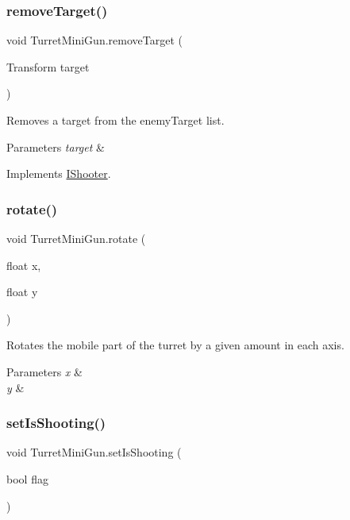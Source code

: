 \subsubsection{\texorpdfstring{remove\+Target()}{removeTarget()}}
{\footnotesize\ttfamily void Turret\+Mini\+Gun.\+remove\+Target (\begin{DoxyParamCaption}\item[{Transform}]{target }\end{DoxyParamCaption})}



Removes a target from the enemy\+Target list. 


\begin{DoxyParams}{Parameters}
{\em target} & \\
\hline
\end{DoxyParams}


Implements \mbox{\hyperlink{interface_i_shooter}{I\+Shooter}}.

\mbox{\label{class_turret_mini_gun_a31f68aef8df52f09916e4540c47c9fde}} 
\subsubsection{\texorpdfstring{rotate()}{rotate()}}
{\footnotesize\ttfamily void Turret\+Mini\+Gun.\+rotate (\begin{DoxyParamCaption}\item[{float}]{x,  }\item[{float}]{y }\end{DoxyParamCaption})}



Rotates the mobile part of the turret by a given amount in each axis. 


\begin{DoxyParams}{Parameters}
{\em x} & \\
\hline
{\em y} & \\
\hline
\end{DoxyParams}
\mbox{\label{class_turret_mini_gun_ab783f041cc7969bc9477a2c33ff4fc92}} 
\subsubsection{\texorpdfstring{set\+Is\+Shooting()}{setIsShooting()}}
{\footnotesize\ttfamily void Turret\+Mini\+Gun.\+set\+Is\+Shooting (\begin{DoxyParamCaption}\item[{bool}]{flag }\end{DoxyParamCaption})}




